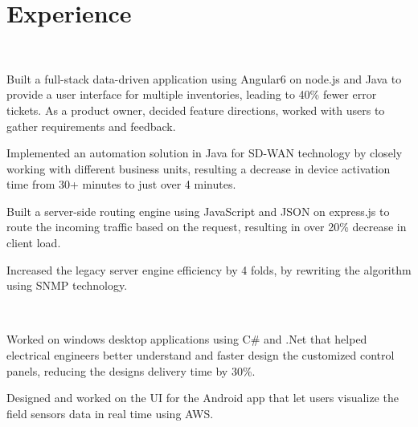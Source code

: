 \documentclass[]{rinkal_resume}
\begin{document}
\begin{minipage}[t]{0.69\textwidth} 


\section{Experience}

\hfill\   
\vspace{\topsep} %
\begin{tightemize}
\item Built a full-stack data-driven application using Angular6 on node.js and Java to provide a user interface for multiple inventories, leading to 40\% fewer error tickets. As a product owner, decided feature directions, worked with users to gather requirements and feedback.
\item Implemented an automation solution in Java for SD-WAN technology by closely working with different business units, resulting a decrease in device activation time from 30+ minutes to just over 4 minutes.
\item Built a server-side routing engine using JavaScript and JSON on express.js to route the incoming traffic based on the request, resulting in over 20\% decrease in client load.
\item Increased the legacy server engine efficiency by 4 folds, by rewriting the algorithm using SNMP technology.
\end{tightemize}
\smallsectionsep

 \\
\begin{tightemize}
\item Worked on windows desktop applications using C\# and .Net that helped electrical engineers better understand and faster design the customized control panels, reducing the designs delivery time by 30\%.
\item Designed and worked on the UI for the Android app that let users visualize the field sensors data in real time using AWS.
\end{tightemize}
\smallsectionsep



\end{minipage}
\end{document}
